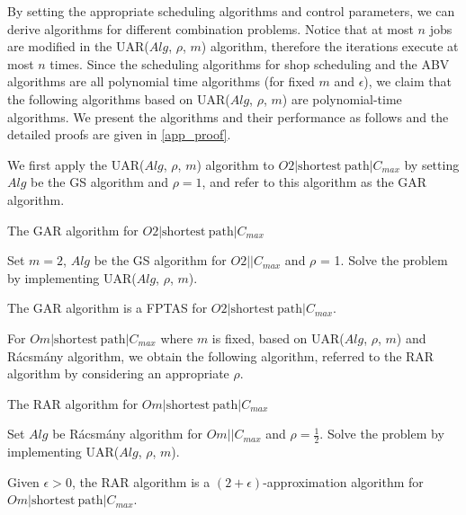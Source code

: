 \documentclass{llncs}
\numberwithin{subcase}{case}
\begin{document}
By setting the appropriate scheduling algorithms and control parameters, we can derive algorithms for different combination problems. Notice that at most $n$ jobs are modified in the UAR($Alg$, $\rho$, $m$) algorithm, therefore the iterations execute at most $n$ times. Since the scheduling algorithms for shop scheduling and the ABV algorithms are all polynomial time algorithms (for fixed $m$ and $\epsilon$), we claim that the following algorithms based on UAR($Alg$, $\rho$, $m$) are polynomial-time algorithms. We present the algorithms and their performance as follows and the detailed proofs are given in \ref{app_proof}.

We first apply the UAR($Alg$, $\rho$, $m$) algorithm to $O2|\mathrm{shortest}~\mathrm{path}|C_{max}$ by setting $Alg$ be the GS algorithm and $\rho = 1$, and refer to this algorithm as the GAR algorithm.

\begin{algorithm}[htb]
\caption{The GAR algorithm for $O2|\mathrm{shortest}~\mathrm{path}|C_{max}$}
\label{alg_gar}
\begin{algorithmic}[1]
\STATE Set $m = 2$, $Alg$ be the GS algorithm for $O2||C_{max}$ and $\rho$ = 1.
\STATE Solve the problem by implementing UAR($Alg$, $\rho$, $m$).
\end{algorithmic}
\end{algorithm}

\begin{theorem}
The GAR algorithm is a FPTAS for $O2|\mathrm{shortest}~\mathrm{path}|C_{max}$.  \label{th_GAR}
\end{theorem}

For $Om|\mathrm{shortest}~\mathrm{path}|C_{max}$ where $m$ is fixed, based on UAR($Alg$, $\rho$, $m$) and R{\'a}csm{\'a}ny algorithm, we obtain the following algorithm, referred to the RAR algorithm by considering an appropriate $\rho$.

\begin{algorithm}[htb]
\caption{The RAR algorithm for $Om|\mathrm{shortest}~\mathrm{path}|C_{max}$}
\label{alg_rar}
\begin{algorithmic}[1]
\STATE Set $Alg$ be R{\'a}csm{\'a}ny algorithm for $Om||C_{max}$ and $\rho = \frac{1}{2}$.
\STATE Solve the problem by implementing UAR($Alg$, $\rho$, $m$).
\end{algorithmic}
\end{algorithm}
\begin{theorem}
Given $\epsilon > 0$, the RAR algorithm is a $(2+\epsilon)$-approximation algorithm for $Om|\mathrm{shortest}~\mathrm{path}|C_{max}$.  \label{th_RAR}
\end{theorem}
\end{document}
